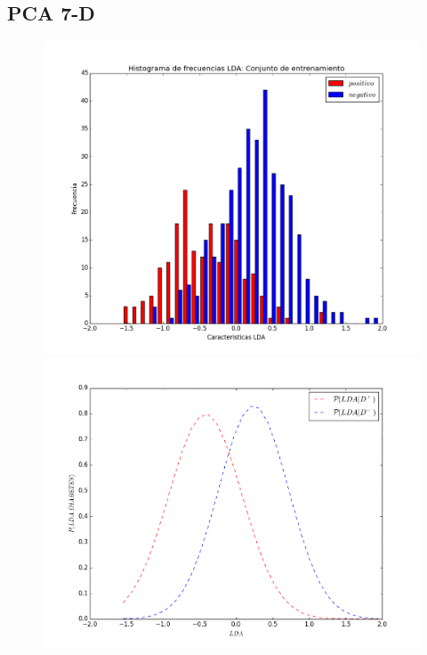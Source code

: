\documentclass[letter, titlepage, 10pt]{article}
\begin{document}
\newpage


\subsection{PCA 7-D}
  \begin{figure}[H]
  \centering
    \begin{minipage}{.5\textwidth}
        \centering
        \includegraphics[width=1\linewidth]{images/Histograma_D7}
    \end{minipage}%
    \begin{minipage}{.5\textwidth}
        \centering
        \includegraphics[width=1\linewidth]{images/PDF_D7}

\end{minipage}
\end{figure}
\end{document}
